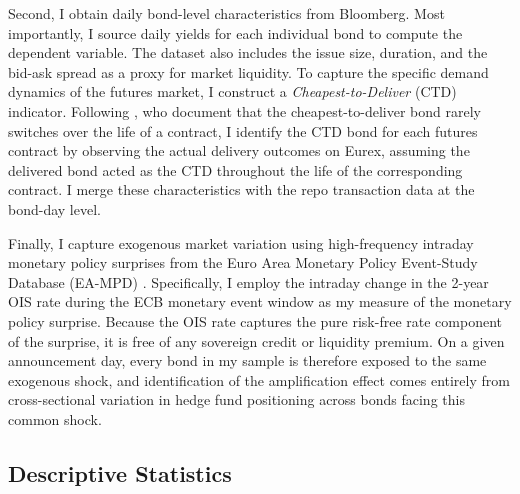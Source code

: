 \documentclass[english, 11pt, oneside]{article}
\begin{document}
Second, I obtain daily bond-level characteristics from Bloomberg. Most importantly, I source daily yields for each individual bond to compute the dependent variable. The dataset also includes the issue size, duration, and the bid-ask spread as a proxy for market liquidity. To capture the specific demand dynamics of the futures market, I construct a \textit{Cheapest-to-Deliver} (CTD) indicator. Following \citet{pelizzon2025}, who document that the cheapest-to-deliver bond rarely switches over the life of a contract, I identify the CTD bond for each futures contract by observing the actual delivery outcomes on Eurex, assuming the delivered bond acted as the CTD throughout the life of the corresponding contract. I merge these characteristics with the repo transaction data at the bond-day level.

Finally, I capture exogenous market variation using high-frequency intraday monetary policy surprises from the Euro Area Monetary Policy Event-Study Database (EA-MPD) \citep{altavilla2019}. Specifically, I employ the intraday change in the 2-year OIS rate during the ECB monetary event window as my measure of the monetary policy surprise. Because the OIS rate captures the pure risk-free rate component of the surprise, it is free of any sovereign credit or liquidity premium. On a given announcement day, every bond in my sample is therefore exposed to the same exogenous shock, and identification of the amplification effect comes entirely from cross-sectional variation in hedge fund positioning across bonds facing this common shock.

\subsection{Descriptive Statistics}
\end{document}
